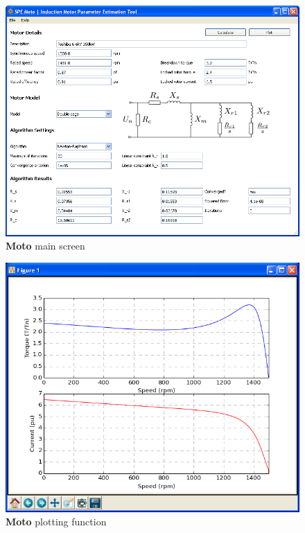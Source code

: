 \documentclass{article}
\begin{document}
\begin{figure}[!htp]
\begin{center}
\includegraphics[scale=0.6]{./Figures/moto_main.png}
\caption{\textbf{Moto} main screen}
\label{fig:moto_main}
\end{center}
\end{figure}

\begin{figure}[!ht]
\begin{center}
\includegraphics[scale=0.65]{./Figures/moto_plot.png}
\caption{\textbf{Moto} plotting function}
\label{fig:moto_plot}
\end{center}
\end{figure}
\end{document}
